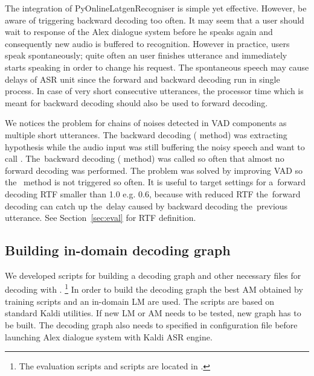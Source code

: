 The integration of \ac{PyOnlineLatgenRecogniser} is simple yet effective.
However, be aware of triggering backward decoding too often. 
It may seem that a user should wait to response of the Alex dialogue system before he speaks again and consequently new audio is buffered to recognition.
However in practice, users speak spontaneously; quite often an user finishes utterance and immediately starts speaking in order to change his request.
The spontaneous speech may cause delays of \ac{ASR} unit since the forward and backward decoding run in single process.
In case of very short consecutive utterances, the processor time which is meant for backward decoding should also be used to forward decoding.

We notices the problem for chains of noises detected in \ac{VAD} components as multiple short utterances.
The backward decoding ( method) was extracting hypothesis while the audio input was still buffering the noisy speech and want to call .
The~backward decoding ( method) was called so often that almost no forward decoding was performed.
The problem was solved by improving \ac{VAD} so the~ method is not triggered so often.
It is useful to target settings for a~forward decoding \ac{RTF} smaller than 1.0 e.g. 0.6, because with reduced RTF the~forward decoding can catch up the~delay caused by backward decoding the~previous utterance.
See Section~\ref{sec:eval} for \ac{RTF} definition.

\subsection{Building in-domain decoding graph}
\label{sub:hclg}
We developed scripts for building a decoding graph and other necessary files for decoding with . \footnote{The evaluation scripts and  scripts are located in .}
In order to build the decoding graph the best \ac{AM} obtained by training scripts  and an in-domain \ac{LM} are used.
The scripts are based on standard Kaldi utilities.
If new \ac{LM} or \ac{AM} needs to be tested, new  graph has to be built.
The decoding graph also needs to specified in configuration file before launching Alex dialogue system with Kaldi \ac{ASR} engine.

